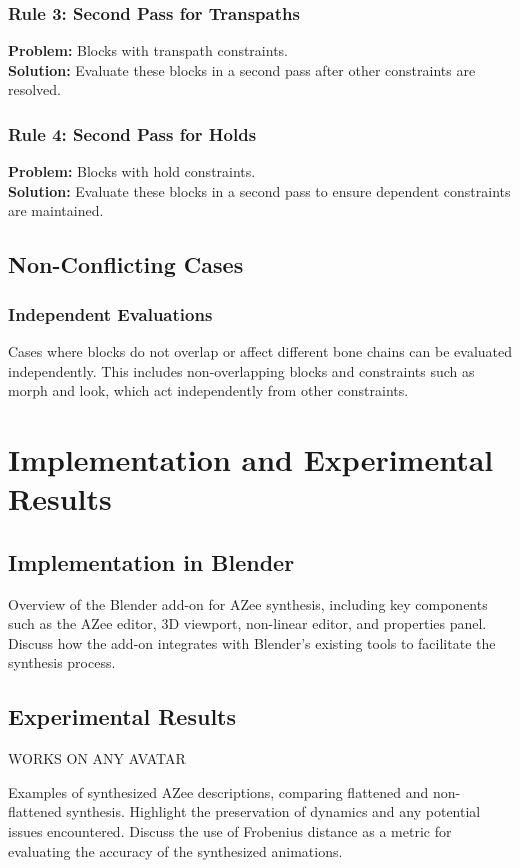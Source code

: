 \documentclass[../../main.tex]{subfiles}
\begin{document}
\subsubsection{Rule 3: Second Pass for Transpaths}
\textbf{Problem:} Blocks with transpath constraints.\\
\textbf{Solution:} Evaluate these blocks in a second pass after other constraints are resolved.

\subsubsection{Rule 4: Second Pass for Holds}
\textbf{Problem:} Blocks with hold constraints.\\
\textbf{Solution:} Evaluate these blocks in a second pass to ensure dependent constraints are maintained.

\subsection{Non-Conflicting Cases}
\subsubsection{Independent Evaluations}
Cases where blocks do not overlap or affect different bone chains can be evaluated independently. This includes non-overlapping blocks and constraints such as morph and look, which act independently from other constraints.

\section{Implementation and Experimental Results}

\subsection{Implementation in Blender}
Overview of the Blender add-on for AZee synthesis, including key components such as the AZee editor, 3D viewport, non-linear editor, and properties panel. Discuss how the add-on integrates with Blender's existing tools to facilitate the synthesis process.

\subsection{Experimental Results}

WORKS ON ANY AVATAR

Examples of synthesized AZee descriptions, comparing flattened and non-flattened synthesis. Highlight the preservation of dynamics and any potential issues encountered. Discuss the use of Frobenius distance as a metric for evaluating the accuracy of the synthesized animations.
\end{document}
